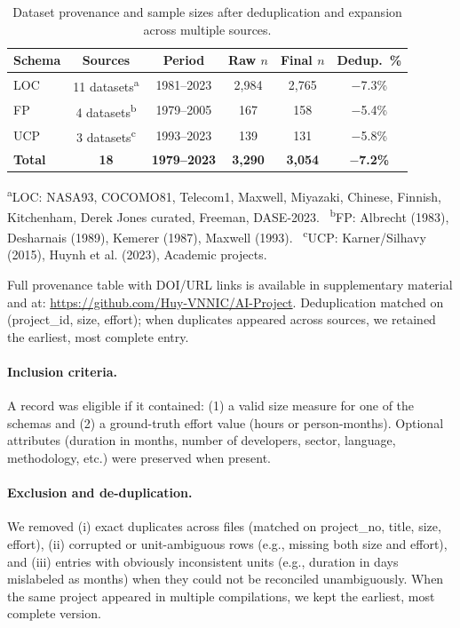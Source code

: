 \documentclass[11pt,a4paper]{article}
\begin{document}
\begin{table}[h]
\centering
\caption{Dataset provenance and sample sizes after deduplication and expansion across multiple sources.}
\label{tab:dataset-summary}
\small
\begin{tabular}{lccccc}
\toprule
Schema & Sources & Period & Raw $n$ & Final $n$ & Dedup.~\%\\
\midrule
LOC & 11 datasets\textsuperscript{a} & 1981--2023 & 2,984 & 2,765 & $-$7.3\% \\
FP  & 4 datasets\textsuperscript{b}  & 1979--2005 & 167   & 158   & $-$5.4\% \\
UCP & 3 datasets\textsuperscript{c}  & 1993--2023 & 139   & 131   & $-$5.8\% \\
\midrule
\textbf{Total} & \textbf{18} & \textbf{1979--2023} & \textbf{3,290} & \textbf{3,054} & \textbf{$-$7.2\%} \\
\bottomrule
\end{tabular}
\vspace{0.3em}

\raggedright\footnotesize
\textsuperscript{a}LOC: NASA93, COCOMO81, Telecom1, Maxwell, Miyazaki, Chinese, Finnish, Kitchenham, Derek Jones curated, Freeman, DASE-2023.~
\textsuperscript{b}FP: Albrecht (1983), Desharnais (1989), Kemerer (1987), Maxwell (1993).~
\textsuperscript{c}UCP: Karner/Silhavy (2015), Huynh et al. (2023), Academic projects.
\end{table}

\noindent Full provenance table with DOI/URL links is available in supplementary material and at: \url{https://github.com/Huy-VNNIC/AI-Project}. Deduplication matched on (project\_id, size, effort); when duplicates appeared across sources, we retained the earliest, most complete entry.


\paragraph{Inclusion criteria.}
A record was eligible if it contained: (1) a valid size measure for one of the schemas and (2) a ground-truth effort value (hours or person-months). Optional attributes (duration in months, number of developers, sector, language, methodology, etc.) were preserved when present.

\paragraph{Exclusion and de-duplication.}
We removed (i) exact duplicates across files (matched on project\_no, title, size, effort), 
(ii) corrupted or unit-ambiguous rows (e.g., missing both size and effort), 
and (iii) entries with obviously inconsistent units (e.g., duration in days mislabeled as months) when they could not be reconciled unambiguously. 
When the same project appeared in multiple compilations, we kept the earliest, most complete version.
\end{document}
